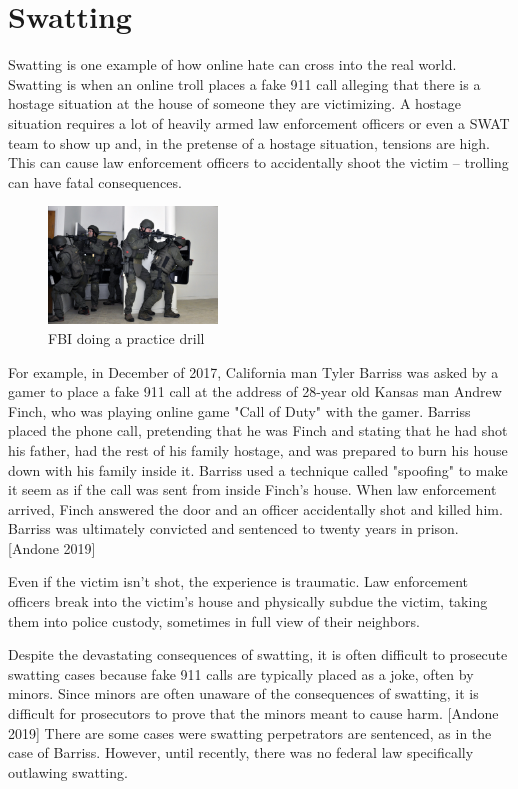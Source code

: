 \documentclass[class=book, crop=false]{standalone}
\begin{document}
\section{Swatting}

Swatting is one example of how online hate can cross into the real world. Swatting is when an online troll places a fake 911 call alleging that there is a hostage situation at the house of someone they are victimizing. A hostage situation requires a lot of heavily armed law enforcement officers or even a SWAT team to show up and, in the pretense of a hostage situation, tensions are high. This can cause law enforcement officers to accidentally shoot the victim -- trolling can have fatal consequences.

\begin{figure} %
    \centering
    \includegraphics[width=0.4\textwidth]{FBI}
    \caption{FBI doing a practice drill}
\end{figure}

For example, in December of 2017, California man Tyler Barriss was asked by a gamer to place a fake 911 call at the address of 28-year old Kansas man Andrew Finch, who was playing online game "Call of Duty" with the gamer. Barriss placed the phone call, pretending that he was Finch and stating that he had shot his father, had the rest of his family hostage, and was prepared to burn his house down with his family inside it. Barriss used a technique called "spoofing" to make it seem as if the call was sent from inside Finch's house. When law enforcement arrived, Finch answered the door and an officer accidentally shot and killed him. Barriss was ultimately convicted and sentenced to twenty years in prison. [Andone 2019]

Even if the victim isn't shot, the experience is traumatic. Law enforcement officers break into the victim's house and physically subdue the victim, taking them into police custody, sometimes in full view of their neighbors.

Despite the devastating consequences of swatting, it is often difficult to prosecute swatting cases because fake 911 calls are typically placed as a joke, often by minors. Since minors are often unaware of the consequences of swatting, it is difficult for prosecutors to prove that the minors meant to cause harm. [Andone 2019] There are some cases were swatting perpetrators are sentenced, as in the case of Barriss. However, until recently, there was no federal law specifically outlawing swatting.
\end{document}
